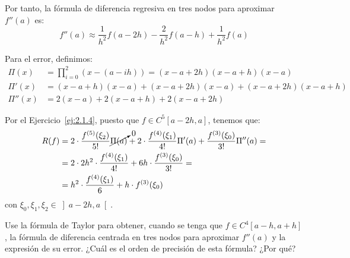 \begin{ejercicio}
    Por tanto, la fórmula de diferencia regresiva en tres nodos para aproximar $f''(a)$ es:
    \[
    f''(a) \approx \frac{1}{h^2}f(a - 2h) - \frac{2}{h^2}f(a - h) + \frac{1}{h^2}f(a)
    \]

    Para el error, definimos:
    \begin{align*}
        \Pi(x) &= \prod_{i=0}^{2}(x - (a - ih)) = (x - a + 2h)(x - a + h)(x - a)\\
        \Pi'(x) &= (x-a+h)(x-a) + (x-a+2h)(x-a) + (x-a+2h)(x-a+h)\\
        \Pi''(x) &= 2(x-a) + 2(x-a+h) + 2(x-a+2h)
    \end{align*}

    Por el Ejercicio~\ref{ej:2.1.4}, puesto que $f \in C^5[a - 2h, a]$, tenemos que:
    \begin{align*}
        R(f) &= 2\cdot \frac{f^{(5)}(\xi_2)}{5!}\cancelto{0}{\Pi(a)} + 2\cdot \frac{f^{(4)}(\xi_1)}{4!}\Pi'(a) + \frac{f^{(3)}(\xi_0)}{3!}\Pi''(a)
        =\\&=2\cdot 2h^2\cdot \frac{f^{(4)}(\xi_1)}{4!} + 6h\cdot \frac{f^{(3)}(\xi_0)}{3!}
        =\\&=h^2\cdot \frac{f^{(4)}(\xi_1)}{6} + h\cdot f^{(3)}(\xi_0)
    \end{align*}
    con $\xi_0, \xi_1, \xi_2 \in \left] a-2h, a \right[$.
\end{ejercicio}

\begin{ejercicio}\label{ej:2.1.6}
    Use la fórmula de Taylor para obtener, cuando se tenga que $f \in C^4[a - h, a + h]$, la fórmula de diferencia centrada en tres nodos para aproximar $f''(a)$ y la expresión de su error. ¿Cuál es el orden de precisión de esta fórmula? ¿Por qué?
\end{ejercicio}

